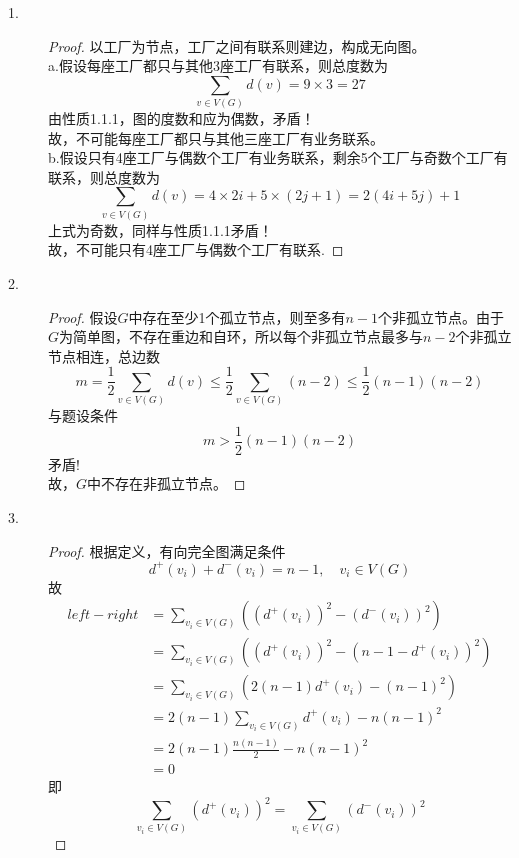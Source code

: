 \documentclass[UTF8, onecolumn, a4paper]{article}
\begin{document}
\begin{description}
\item[1.] 
\begin{proof}
以工厂为节点，工厂之间有联系则建边，构成无向图。\\
a.假设每座工厂都只与其他3座工厂有联系，则总度数为
$$\underset{v\in V(G)}{\sum}d(v) = 9 \times 3 = 27$$
由性质1.1.1，图的度数和应为偶数，矛盾！\\
故，不可能每座工厂都只与其他三座工厂有业务联系。\\
b.假设只有4座工厂与偶数个工厂有业务联系，剩余5个工厂与奇数个工厂有联系，则总度数为
$$\underset{v\in V(G)}{\sum}d(v) = 4 \times 2i + 5 \times(2j+1) = 2(4i+5j)+1$$
上式为奇数，同样与性质1.1.1矛盾！\\
故，不可能只有4座工厂与偶数个工厂有联系.
\end{proof}
\item[2.] 
\begin{proof}
	假设$G$中存在至少1个孤立节点，则至多有$n-1$个非孤立节点。由于$G$为简单图，不存在重边和自环，所以每个非孤立节点最多与$n-2$个非孤立节点相连，总边数
	$$m = \frac{1}{2}\underset{v\in V(G)}{\sum}d(v) \leq \frac{1}{2}\underset{v\in V(G)}{\sum}(n-2) \leq \frac{1}{2}(n-1)(n-2)$$
	与题设条件$$m > \frac{1}{2}(n-1)(n-2)$$矛盾!\\
	故，$G$中不存在非孤立节点。
\end{proof}
\item[3.]
\begin{proof}
根据定义，有向完全图满足条件
$$d^+(v_i)+d^-(v_i) = n-1,\quad v_i\in V(G)$$
故
\begin{equation}
\begin{aligned}
left - right &=
\underset{v_i\in V(G)}{\sum}\left((d^+(v_i))^2 - (d^-(v_i))^2\right)\\ &= 
\underset{v_i\in V(G)}{\sum}\left((d^+(v_i))^2 - (n-1-d^+(v_i))^2\right)\\
&=\underset{v_i\in V(G)}{\sum}\left(2(n-1)d^+(v_i) - (n-1)^2\right)\\
&=2(n-1)\underset{v_i\in V(G)}{\sum}d^+(v_i) - n(n-1)^2\\
&=2(n-1)\frac{n(n-1)}{2} - n(n-1)^2\\
&=0
\end{aligned}
\end{equation}
即
$$\underset{v_i\in V(G)}{\sum}(d^+(v_i))^2 = \underset{v_i\in V(G)}{\sum}(d^-(v_i))^2$$
\end{proof}


\end{description}
\end{document}
